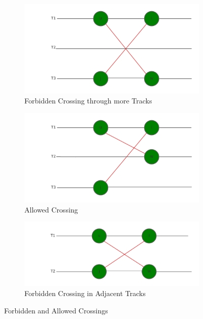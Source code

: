 \documentclass[bachelor, english]{algothesis}
\begin{document}
\begin{figure}[ht]
    \centering

    \begin{subfigure}[b]{0.45\linewidth}
        \includegraphics[width=\linewidth]{figures/Verbot2.png}
        \caption{Forbidden Crossing through more Tracks}
        \label{fig:verbot2}
    \end{subfigure}
    \hfill
    \begin{subfigure}[b]{0.45\linewidth}
        \includegraphics[width=\linewidth]{figures/Erlaubt.png}
        \caption{Allowed Crossing}
        \label{fig:erlaubt}
    \end{subfigure}

    \begin{subfigure}[b]{0.9\linewidth}
        \centering
        \includegraphics[width=0.7\linewidth]{figures/Verbot1.png}
        \caption{Forbidden Crossing in Adjacent Tracks}
        \label{fig:verbot1}
    \end{subfigure}

    \caption{Forbidden and Allowed Crossings}
    \label{fig:crossings}
\end{figure}
\clearpage
\end{document}

